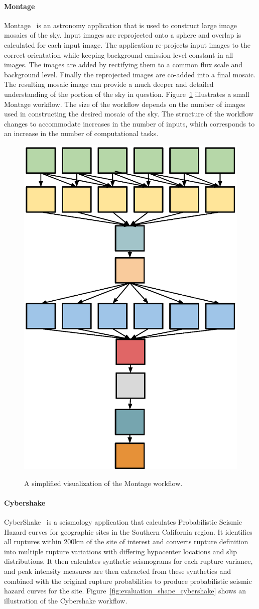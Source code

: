 \documentclass[final,5p,times,twocolumn]{elsarticle}
\begin{document}
\paragraph{\textbf{Montage}}
Montage~\cite{Berriman2004} is an astronomy application that is used to construct large image mosaics of the sky. Input images are reprojected onto a sphere and overlap is calculated for each input image. The application re-projects input images to the correct orientation while keeping background emission level constant in all images. The images are added by rectifying them to a common flux scale and background level. Finally the reprojected images are co-added into a final mosaic. The resulting mosaic image can provide a much deeper and detailed understanding of the portion of the sky in question. Figure~\ref{fig:evaluation_shape_montage} illustrates a small Montage workflow. The size of the workflow depends on the number of images used in constructing the desired mosaic of the sky. The structure of the workflow changes to accommodate increases in the number of inputs, which corresponds to an increase in the number of computational tasks.

\begin{figure}[htb]
	\centering
	\includegraphics[width=0.4\linewidth]{figure15.eps} \\
	\caption{A simplified visualization of the Montage workflow.}
	\label{fig:evaluation_shape_montage}
\end{figure}

\paragraph{\textbf{Cybershake}}
CyberShake~\cite{Graves2010} is a seismology application that calculates Probabilistic Seismic Hazard curves for geographic sites in the Southern California region. It identifies all ruptures within 200km of the site of interest and converts rupture definition into multiple rupture variations with differing hypocenter locations and slip distributions. It then calculates synthetic seismograms for each rupture variance, and peak intensity measures are then extracted from these synthetics and combined with the original rupture probabilities to produce probabilistic seismic hazard curves for the site. Figure~\ref{fig:evaluation_shape_cybershake} shows an illustration of the Cybershake workflow.
\end{document}
